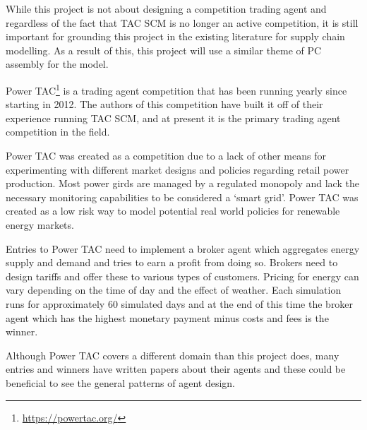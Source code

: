 While this project is not about designing a competition trading agent and regardless of the fact that TAC SCM is no longer an active competition, it is still important for grounding this project in the existing literature for supply chain modelling.
As a result of this, this project will use a similar theme of PC assembly for the model.

Power TAC\footnote{\url{https://powertac.org/}} is a trading agent competition that has been running yearly since starting in 2012.
The authors of this competition have built it off of their experience running TAC SCM, and at present it is the primary trading agent competition in the field.~\cite{ketter2013power}

Power TAC was created as a competition due to a lack of other means for experimenting with different market designs and policies regarding retail power production.
Most power girds are managed by a regulated monopoly and lack the necessary monitoring capabilities to be considered a `smart grid'.
Power TAC was created as a low risk way to model potential real world policies for renewable energy markets.~\cite{ketter2013power}

Entries to Power TAC need to implement a broker agent which aggregates energy supply and demand and tries to earn a profit from doing so.
Brokers need to design tariffs and offer these to various types of customers.
Pricing for energy can vary depending on the time of day and the effect of weather.
Each simulation runs for approximately 60 simulated days and at the end of this time the broker agent which has the highest monetary payment minus costs and fees is the winner.~\cite{ketter2020power}

Although Power TAC covers a different domain than this project does, many entries and winners have written papers about their agents and these could be beneficial to see the general patterns of agent design.
